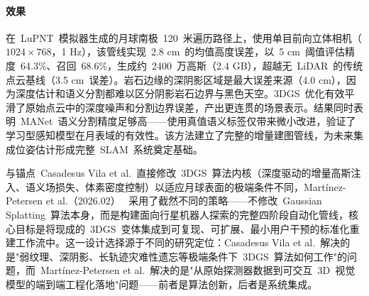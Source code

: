 \paragraph{效果}在~LuPNT~模拟器生成的月球南极~120~米遍历路径上，使用单目前向立体相机（$1024 \times 768$，1 Hz），该管线实现~2.8 cm~的均值高度误差，以~5 cm~阈值评估精度~64.3\%、召回~68.6\%，生成约~2400~万高斯（2.4 GB），超越无~LiDAR~的传统点云基线（3.5 cm~误差）。岩石边缘的深阴影区域是最大误差来源（4.0 cm），因为深度估计和语义分割都难以区分阴影岩石边界与黑色天空。3DGS~优化有效平滑了原始点云中的深度噪声和分割边界误差，产出更连贯的场景表示。结果同时表明~MANet~语义分割精度足够高——使用真值语义标签仅带来微小改进，验证了学习型感知模型在月表域的有效性。该方法建立了完整的增量建图管线，为未来集成位姿估计形成完整~SLAM~系统奠定基础。

与锚点~Casadesus Vila et al.~直接修改~3DGS~算法内核（深度驱动的增量高斯注入、语义场损失、体素密度控制）以适应月球表面的极端条件不同，Martínez-Petersen et al.（2026.02）~\cite{2602_13909} 采用了截然不同的策略——不修改~Gaussian Splatting~算法本身，而是构建面向行星机器人探索的完整四阶段自动化管线，核心目标是将现成的~3DGS~变体集成到可复现、可扩展、最小用户干预的标准化重建工作流中。这一设计选择源于不同的研究定位：Casadesus Vila et al.~解决的是"弱纹理、深阴影、长轨迹灾难性遗忘等极端条件下~3DGS~算法如何工作"的问题，而~Martínez-Petersen et al.~解决的是"从原始探测器数据到可交互~3D~视觉模型的端到端工程化落地"问题——前者是算法创新，后者是系统集成。

